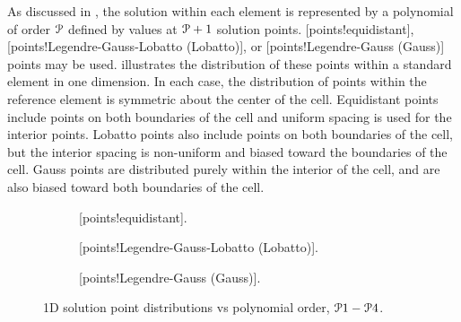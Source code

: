 As discussed in , the solution within each
element is represented by a polynomial of order $\PO$ defined by values
at $\PO[+1]$ solution points.
%
[points!equidistant],
[points!Legendre-Gauss-Lobatto (Lobatto)], or
[points!Legendre-Gauss (Gauss)] points may be used.
%
 illustrates the distribution of these points
within a standard element in one dimension.
%
In each case, the distribution of points within the reference element
is symmetric about the center of the cell.
%
Equidistant points include points on both boundaries of the cell
and uniform spacing is used for the interior points.
%
Lobatto points also include points on both boundaries of the cell,
but the interior spacing is non-uniform and biased toward the
boundaries of the cell.
%
Gauss points are distributed purely within the interior of the cell,
and are also biased toward both boundaries of the cell.


\begin{figure}
  \begin{centering}
    \begin{subfigure}{2.0in}
      \caption{[points!equidistant].}
      \label{FIG:1D_Points_Equal}
    \end{subfigure}%
    \begin{subfigure}{2.0in}
      \caption{[points!Legendre-Gauss-Lobatto (Lobatto)].}
      \label{FIG:1D_Points_Lobatto}
    \end{subfigure}%
    \begin{subfigure}{2.0in}
      \caption{[points!Legendre-Gauss (Gauss)].}
      \label{FIG:1D_Points_Gauss}
    \end{subfigure}
    \caption{1D solution point distributions vs polynomial order,
             $\PO[1]-\PO[4]$.}
    \label{FIG:1D_Points}
  \end{centering}
\end{figure}


